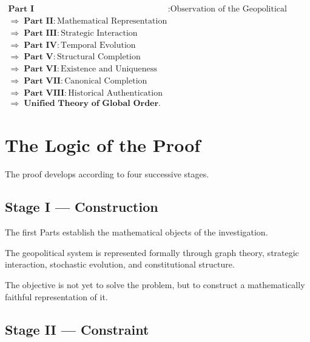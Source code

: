 \documentclass[11pt,openany]{book}
\theoremstyle{plain}
\theoremstyle{definition}
\begin{document}
\[
\boxed{
\begin{aligned}
\textbf{Part I}
&:
\text{Observation of the Geopolitical System}
\\[0.4em]
\Longrightarrow\;
\textbf{Part II}
:
\text{Mathematical Representation}
\\[0.4em]
\Longrightarrow\;
\textbf{Part III}
:
\text{Strategic Interaction}
\\[0.4em]
\Longrightarrow\;
\textbf{Part IV}
:
\text{Temporal Evolution}
\\[0.4em]
\Longrightarrow\;
\textbf{Part V}
:
\text{Structural Completion}
\\[0.4em]
\Longrightarrow\;
\textbf{Part VI}
:
\text{Existence and Uniqueness}
\\[0.4em]
\Longrightarrow\;
\textbf{Part VII}
:
\text{Canonical Completion}
\\[0.4em]
\Longrightarrow\;
\textbf{Part VIII}
:
\text{Historical Authentication}
\\[0.4em]
\Longrightarrow\;
\boxed{\textbf{Unified Theory of Global Order}.}
\end{aligned}
}
\]


\section*{The Logic of the Proof}

The proof develops according to four successive stages.

\subsection*{Stage I — Construction}

The first Parts establish the mathematical objects of the investigation.

The geopolitical system is represented formally through graph theory, strategic interaction, stochastic evolution, and constitutional structure.

The objective is not yet to solve the problem, but to construct a mathematically faithful representation of it.


\subsection*{Stage II — Constraint}
\end{document}
